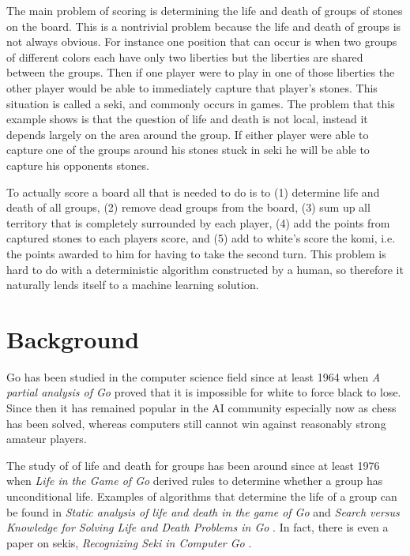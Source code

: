 \documentclass[11pt,letterpaper]{article}
\begin{document}
The main problem of scoring is determining the life and death of groups of stones on the board. This is a nontrivial
problem because the life and death of groups is not always obvious. For instance one position that can occur is
when two groups of different colors each have only two liberties but the liberties are shared between the groups.
Then if one player were to play in one of those liberties the other player would be able to immediately capture that
player's stones. This situation is called a seki, and commonly occurs in games. The problem that this example shows
is that the question of life and death is not local, instead it depends largely on the area around the group. If either
player were able to capture one of the groups around his stones stuck in seki he will be able to capture his
opponents stones.

To actually score a board all that is needed to do is to (1) determine life and death of all groups, (2) remove dead
groups from the board, (3) sum up all territory that is completely surrounded by each player, (4) add the points from
captured stones to each players score, and (5) add to white's score the komi, i.e. the points awarded to him for
having to take the second turn. This problem is hard to do with a deterministic algorithm constructed by a human,
so therefore it naturally lends itself to a machine learning solution.


\section{Background}

Go has been studied in the computer science field since at least 1964 when \emph{A partial analysis of Go}
\cite{TW:64} proved that it is impossible for white to force black to lose. Since then it has remained popular in the
AI community especially now as chess has been solved, whereas computers still cannot win against reasonably
strong amateur players.

The study of of life and death for groups has been around since at least 1976 when \emph{Life in the Game of Go}
\cite{B:76} derived rules to determine whether a group has unconditional life. Examples of algorithms that determine
the life of a group can be found in \emph{Static analysis of life and death in the game of Go} \cite{CC:99} and 
\emph{Search versus Knowledge for Solving Life and Death Problems in Go} \cite{KM:05}.
In fact, there is even a paper on sekis, \emph{Recognizing Seki in Computer Go} \cite{NKM:06}.
\end{document}
